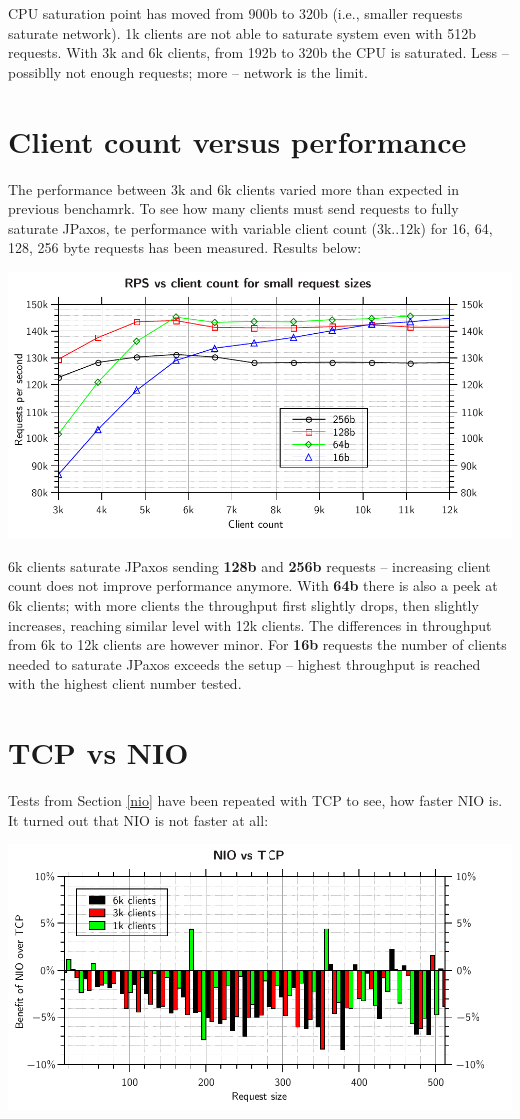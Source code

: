 \documentclass[a4paper,11pt,notitlepage,hidelinks]{article}
\begin{document}
CPU saturation point has moved from 900b to 320b (i.e., smaller requests saturate network).
1k clients are not able to saturate system even with 512b requests. With 3k and 6k clients, from 192b to 320b the CPU is saturated. Less -- possiblly not enough requests;  more -- network is the limit.

\section{Client count versus performance}

The performance between 3k and 6k clients varied more than expected in previous benchamrk. To see how many clients must send requests to fully saturate JPaxos, te performance with variable client count (3k..12k) for {16, 64, 128, 256} byte requests has been measured. Results below:

\noindent\ignorespaces\includegraphics{cliCount_rps.pdf}

6k clients saturate JPaxos sending \textbf{128b} and \textbf{256b} requests -- increasing client count does not improve performance anymore.
With \textbf{64b} there is also a peek at 6k clients; with more clients the throughput first slightly drops, then slightly increases, reaching similar level with 12k clients. The differences in throughput from 6k to 12k clients are however minor.
For \textbf{16b} requests the number of clients needed to saturate JPaxos exceeds the setup -- highest throughput is reached with  the highest client number tested.

\section{TCP vs NIO}

Tests from Section \ref{nio} have been repeated with TCP to see, how faster NIO is. It turned out that NIO is not faster at all:

\noindent\ignorespaces\includegraphics{nio_tcp.pdf}
\end{document}
